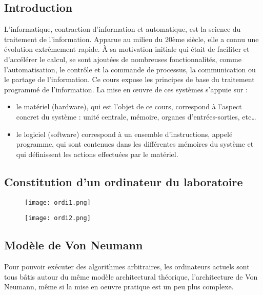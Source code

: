 \subsection{Introduction}
L'informatique, contraction d'information et automatique, est la science du traitement de l'information. Apparue au milieu du 20ème siècle, elle a connu une évolution extrêmement rapide. À sa motivation initiale qui était de faciliter et d'accélérer le calcul, se sont ajoutées de nombreuses fonctionnalités, comme l'automatisation, le contrôle et la commande de processus, la communication ou le partage de l'information.
Ce cours expose les principes de base du traitement programmé de l’information. La mise en œuvre de ces systèmes s’appuie sur :
\begin{itemize}
\item le matériel (hardware), qui est l’objet de ce cours, correspond à l’aspect concret du système : unité centrale, mémoire, organes d’entrées-sorties, etc…
\item le logiciel (software) correspond à un ensemble d’instructions, appelé programme, qui sont contenues dans les différentes mémoires du système et qui définissent les actions effectuées par le matériel.
\end{itemize}


\subsection{Constitution d’un ordinateur du laboratoire}


\begin{figure}[h]
\begin{minipage}[c]{.49\linewidth}
\begin{center}
\texttt{[image: ordi1.png]}
\label{}
\end{center}
\end{minipage} \hfill
\begin{minipage}[c]{.49\linewidth}
\begin{center}
\texttt{[image: ordi2.png]}
\label{}
\end{center}
\end{minipage}
\end{figure}

\subsection{Modèle de Von Neumann}

Pour pouvoir exécuter des algorithmes arbitraires, les ordinateurs actuels sont tous bâtis
autour du même modèle architectural théorique, l’architecture de Von Neumann, même
si la mise en oeuvre pratique est un peu plus complexe.

